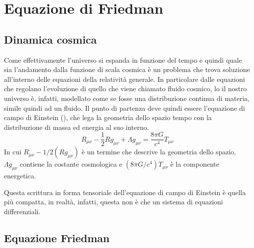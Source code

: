 \section{Equazione di Friedman}\label{sec:equazione-friedman}
\subsection{Dinamica cosmica}\label{sec:dinamica-cosmica}

Come effettivamente l'universo si espanda in funzione del tempo e quindi quale sia l'andamento dalla funzione di scala cosmica è un problema che trova soluzione all'interno delle equazioni della relatività generale. In particolare dalle equazioni che regolano l'evoluzione di quello che viene chiamato fluido cosmico, lo il nostro universo è, infatti, modellato come se fosse una distribuzione continua di materia, simile quindi ad un fluido. Il punto di partenza deve quindi essere l'equazione di campo di Einstein (), che lega la geometria dello spazio tempo con la distribuzione di massa ed energia al suo interno.
\begin{equation}\label{eq:equazione-campo-einstein}
    R_{\mu \nu} -\frac{1}{2}R g_{\mu \nu} + \Lambda g_{\mu \nu} = \frac{8\pi G}{c^4}T_{\mu \nu}
\end{equation}
In cui $R_{\mu \nu}-{1}/{2}(R g_{\mu \nu})$  è un termine che descrive la geometria dello spazio, $\Lambda g_{\mu \nu}$ contiene la costante cosmologica e $({8\pi G}/{c^4})T_{\mu \nu}$ è la componente energetica.

Questa scrittura in forma tensoriale dell'equazione di campo di Einstein è quella più compatta, in realtà, infatti, questa non è che un sistema di equazioni differenziali.
\subsection{Equazione Friedman}\label{sec:sub-equazione-friedman}

